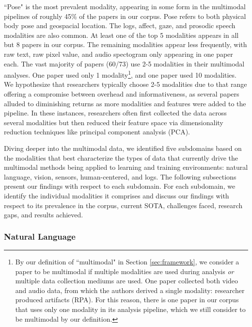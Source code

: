 \documentclass[manuscript,screen,review]{acmart}
\begin{document}
``Pose" is the most prevalent modality, appearing in some form in the multimodal pipelines of roughly 45\% of the papers in our corpus. Pose refers to both physical body pose and geospacial location. The logs, affect, gaze, and prosodic speech modalities are also common. At least one of the top 5 modalities appears in all but 8 papers in our corpus. The remaining modalities appear less frequently, with raw text, raw pixel value, and audio spectogram only appearing in one paper each. The vast majority of papers (60/73) use 2-5 modalities in their multimodal analyses. One paper used only 1 modality\footnote{By our definition of ``multimodal" in Section \ref{sec:framework}, we consider a paper to be multimodal if multiple modalities are used during analysis \textit{or} multiple data collection mediums are used. One paper \cite{3809293172} collected both video and audio data, from which the authors derived a single modality: researcher produced artifacts (RPA). For this reason, there is one paper in our corpus that uses only one modality in its analysis pipeline, which we still consider to be multimodal by our definition.}, and one paper used 10 modalities. We hypothesize that researchers typically choose 2-5 modalities due to that range offering a compromise between overhead and informativeness, as several papers alluded to diminishing returns as more modalities and features were added to the pipeline. In these instances, researchers often first collected the data across several modalities but then reduced their feature space via dimensionality reduction techniques like principal component analysis (PCA). 

Diving deeper into the multimodal data, we identified five subdomains based on the modalities that best characterize the types of data that currently drive the multimodal methods being applied to learning and training environments: natural language, vision, sensors, human-centered, and logs. The following subsections present our findings with respect to each subdomain. For each subdomain, we identify the individual modalities it comprises and discuss our findings with respect to its prevalence in the corpus, current SOTA, challenges faced, research gaps, and results achieved.

\subsubsection{Natural Language}\label{subsubsec:language}
\end{document}
